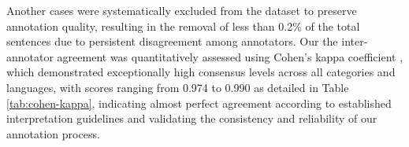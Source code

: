 \documentclass[12pt, letterpaper]{template}
\begin{document}
\begin{table}[h]
\caption{Cohen's Kappa coefficients measuring inter-annotator agreement across ESG categories and languages in the ViEn-ESG dataset.}
\label{tab:cohen-kappa}
\centering
{}
\end{table}

Another cases were systematically excluded from the dataset to preserve annotation quality, resulting in the removal of less than 0.2\% of the total sentences due to persistent disagreement among annotators. Our the inter-annotator agreement was quantitatively assessed using Cohen's kappa coefficient \citep{Cohen1960}, which demonstrated exceptionally high consensus levels across all categories and languages, with scores ranging from 0.974 to 0.990 as detailed in Table \ref{tab:cohen-kappa}, indicating almost perfect agreement according to established interpretation guidelines and validating the consistency and reliability of our annotation process. 
\end{document}
